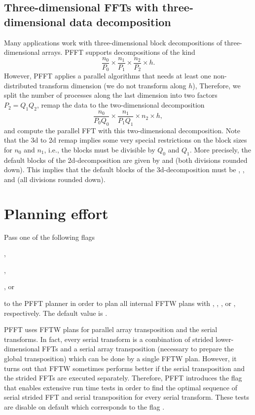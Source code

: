 \subsection{Three-dimensional FFTs with three-dimensional data decomposition}
Many applications work with three-dimensional block decompositions of three-dimensional arrays.
PFFT supports decompositions of the kind
\begin{equation*}
  \frac{n_0}{P_0} \times \frac{n_1}{P_1} \times \frac{n_2}{P_2} \times h.
\end{equation*}
However, PFFT applies a parallel algorithms that needs at least one non-distributed transform dimension (we do not transform along $h$),
Therefore, we split the number of processes along the last dimension into two factors $P_2=Q_1Q_2$, remap
the data to the two-dimensional decomposition
\begin{equation*}
  \frac{n_0}{P_0Q_0} \times \frac{n_1}{P_1Q_1} \times n_2 \times h,
\end{equation*}
and compute the parallel FFT with this two-dimensional decomposition.
Note that the 3d to 2d remap implies some very special restrictions on the block sizes for $n_0$ and $n_1$, i.e.,
the blocks must be divisible by $Q_0$ and $Q_1$. More precisely, the default blocks of the 2d-decomposition
are given by  and  (both divisions rounded down).
This implies that the default blocks of the 3d-decomposition must be ,
, and  (all divisions rounded down).

\section{Planning effort}
Pass one of the following flags
\begin{compactitem}
  \item {},
  \item {},
  \item {}, or
  \item {}
\end{compactitem}
to the PFFT planner in order to plan all internal FFTW plans with , , , or ,
respectively. The default value is .

PFFT uses FFTW plans for parallel array transposition and the serial transforms. In fact, every serial transform is a combination of
strided lower-dimensional FFTs and a serial array transposition (necessary to prepare the global transposition) which can be done by a single FFTW plan.
However, it turns out that FFTW sometimes performs better if the serial transposition and the strided FFTs are executed separately.
Therefore, PFFT introduces the flag  that enables extensive run time tests in order to find the optimal sequence of
serial strided FFT and serial transposition for every serial transform. These tests are disable on default which corresponds to the flag .

